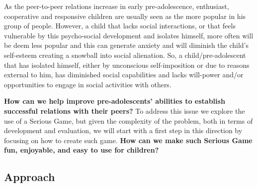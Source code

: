 \par As the peer-to-peer relations increase in early pre-adolescence, enthusiast, cooperative and responsive children are usually seen as the more popular in his group of people. However, a child that lacks social interactions, or that feels vulnerable by this psycho-social development and isolates himself, more often will be deem less popular and this can generate anxiety and will diminish the child's self-esteem \cite{tavares_pereira_gomes_monteiro_gomes_2007} \cite{campos_1990} creating a snowball into social alienation. So, a child/pre-adolescent that has isolated himself, either by unconscious self-imposition or due to reasons external to him, has diminished social capabilities and lacks will-power and/or opportunities to engage in social activities with others. 

\par \textbf{How can we help improve pre-adolescents' abilities to establish successful relations with their peers?} To address this issue we explore the use of a Serious Game, but given the complexity of the problem, both in terms of development and evaluation, we will start with a first step in this direction by focusing on how to create such game. \textbf{How can we make such Serious Game fun, enjoyable, and easy to use for children?}


\subsection{Approach}


